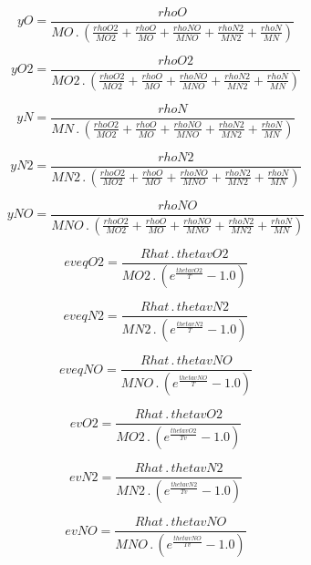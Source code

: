 \documentclass{article}
\begin{document}
\begin{dmath}yO = \frac{rhoO}{MO \,.\, \left(\frac{rhoO2}{MO2} + \frac{rhoO}{MO} + \frac{rhoNO}{MNO} + \frac{rhoN2}{MN2} + \frac{rhoN}{MN}\right)}\end{dmath}

\begin{dmath}yO2 = \frac{rhoO2}{MO2 \,.\, \left(\frac{rhoO2}{MO2} + \frac{rhoO}{MO} + \frac{rhoNO}{MNO} + \frac{rhoN2}{MN2} + \frac{rhoN}{MN}\right)}\end{dmath}

\begin{dmath}yN = \frac{rhoN}{MN \,.\, \left(\frac{rhoO2}{MO2} + \frac{rhoO}{MO} + \frac{rhoNO}{MNO} + \frac{rhoN2}{MN2} + \frac{rhoN}{MN}\right)}\end{dmath}

\begin{dmath}yN2 = \frac{rhoN2}{MN2 \,.\, \left(\frac{rhoO2}{MO2} + \frac{rhoO}{MO} + \frac{rhoNO}{MNO} + \frac{rhoN2}{MN2} + \frac{rhoN}{MN}\right)}\end{dmath}

\begin{dmath}yNO = \frac{rhoNO}{MNO \,.\, \left(\frac{rhoO2}{MO2} + \frac{rhoO}{MO} + \frac{rhoNO}{MNO} + \frac{rhoN2}{MN2} + \frac{rhoN}{MN}\right)}\end{dmath}

\begin{dmath}eveqO2 = \frac{Rhat \,.\, thetavO2}{MO2 \,.\, \left(e^{\frac{thetavO2}{T}} - 1.0\right)}\end{dmath}

\begin{dmath}eveqN2 = \frac{Rhat \,.\, thetavN2}{MN2 \,.\, \left(e^{\frac{thetavN2}{T}} - 1.0\right)}\end{dmath}

\begin{dmath}eveqNO = \frac{Rhat \,.\, thetavNO}{MNO \,.\, \left(e^{\frac{thetavNO}{T}} - 1.0\right)}\end{dmath}

\begin{dmath}evO2 = \frac{Rhat \,.\, thetavO2}{MO2 \,.\, \left(e^{\frac{thetavO2}{Tv}} - 1.0\right)}\end{dmath}

\begin{dmath}evN2 = \frac{Rhat \,.\, thetavN2}{MN2 \,.\, \left(e^{\frac{thetavN2}{Tv}} - 1.0\right)}\end{dmath}

\begin{dmath}evNO = \frac{Rhat \,.\, thetavNO}{MNO \,.\, \left(e^{\frac{thetavNO}{Tv}} - 1.0\right)}\end{dmath}
\end{document}
